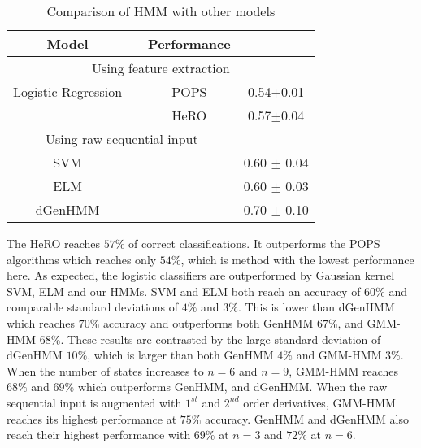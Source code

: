 \begin{table}[!ht]
\center
\caption{Comparison of HMM with other models}
\begin{tabular}{*4c}
\toprule
 Model							&   			    & Performance 	 	\\  
\toprule

\multicolumn{4}{c}{Using feature extraction}    \\ \hline
Logistic Regression	 & & POPS & 0.54$\pm$0.01				  \\
& & HeRO			&   0.57$\pm$0.04\\   \hline
\multicolumn{3}{c}{Using raw sequential input}    \\    \hline  
SVM      & &                       &   0.60 $\pm$ 0.04   			\\
ELM		& &						&   0.60 $\pm$ 0.03   				\\ 
dGenHMM     & &                     &   0.70 $\pm$ 0.10  \\ \hline

\hline
\end{tabular}
\label{table:results:Lin}
\end{table}%


The HeRO reaches $57\%$ of correct classifications.
It outperforms the POPS algorithms which reaches only $54\%$, which is method with the lowest performance here.
As expected, the logistic classifiers are outperformed by Gaussian kernel SVM, ELM and our HMMs.
SVM and ELM both reach an accuracy of $60\%$ and comparable standard deviations of $4\%$ and $3\%$.
This is lower than dGenHMM which reaches $70\%$ accuracy and outperforms both GenHMM $67\%$, and GMM-HMM $68\%$.
These results are contrasted by the large standard deviation of dGenHMM $10\%$, which is larger than both GenHMM $4\%$ and GMM-HMM $3\%$.
When the number of states increases to $n=6$ and $n=9$, GMM-HMM reaches $68\%$ and $69\%$ which outperforms GenHMM, and dGenHMM.
When the raw sequential input is augmented with $1^{st}$ and $2^{nd}$ order derivatives, GMM-HMM reaches its highest performance at $75\%$ accuracy.
GenHMM and dGenHMM also reach their highest performance with $69\%$ at $n=3$ and $72\%$ at $n=6$.

